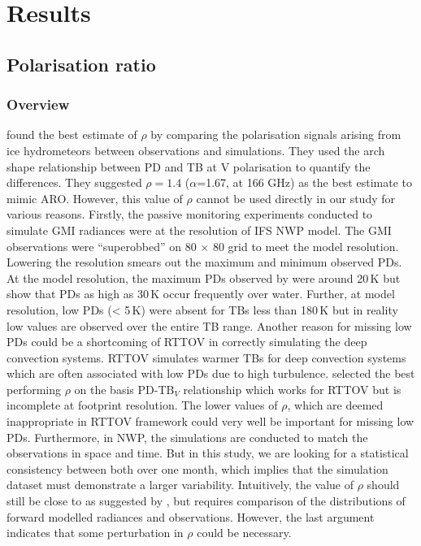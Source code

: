 \documentclass[amt, manuscript]{copernicus}
\begin{document}

\section{Results}


\subsection{Polarisation ratio}
%
\label{sec:polratio_selection}
\subsubsection{Overview}
%
\citet{barlakas:intro:21} found the best estimate of $\rho$ by comparing the polarisation signals arising from ice hydrometeors between observations and simulations. They used the arch shape relationship between PD and TB at V polarisation \citep[PD-TB$_V$,][]{gong:micro:17} to quantify the differences. They suggested $\rho = 1.4$ ($\alpha$=1.67, at 166\,\,GHz) as the best estimate to mimic ARO. However, this value of $\rho$ cannot be used directly in our study for various reasons. Firstly, the passive monitoring experiments conducted to simulate GMI radiances were at the resolution of IFS NWP model. The GMI observations were ``superobbed'' on 80 $\times$ 80 grid to meet the model resolution. Lowering the resolution smears out the maximum and minimum observed PDs. At the model resolution, the maximum PDs observed by \citet{barlakas:intro:21} were around 20\,K but \citet{gong:micro:17} show that PDs as high as 30\,K occur frequently over water. Further, at model resolution, low PDs (< 5\,K) were absent for TBs less than 180\,K but in reality low values are observed over the entire TB range. Another reason for missing low PDs could be a shortcoming of RTTOV in correctly simulating the deep convection systems. RTTOV simulates warmer TBs for deep convection systems which are often associated with low PDs due to high turbulence. \citep{barlakas:intro:21} selected the best performing $\rho$ on the basis PD-TB$_V$ relationship which works for RTTOV but is incomplete at footprint resolution. The lower values of $\rho$, which are deemed inappropriate in RTTOV framework could very well be important for missing low PDs. Furthermore, in NWP, the simulations are conducted to match the observations in space and time. But in this study, we are looking for a statistical consistency between both over  one month, which implies that the simulation dataset must demonstrate a larger variability.  Intuitively, the value of $\rho$ should still be close to as suggested by \citet{barlakas:intro:21}, but requires comparison of the distributions of forward modelled radiances and observations. However, the last argument indicates that some perturbation in $\rho$ could be necessary.
\end{document}
